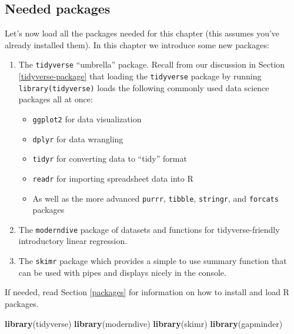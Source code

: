 \documentclass[12pt, krantz2,]{krantz}
\makeatletter
\newenvironment{Shaded}{\begin{snugshade}}{\end{snugshade}}
\newcommand{\KeywordTok}[1]{\textcolor[rgb]{0.27,0.27,0.27}{\textbf{#1}}}
\newcommand{\NormalTok}[1]{#1}
\providecommand{\tightlist}{%
  \setlength{\itemsep}{0pt}\setlength{\parskip}{0pt}}
\newenvironment{kframe}{%
\medskip{}
\setlength{\fboxsep}{.8em}
 \def\at@end@of@kframe{}%
 \ifinner\ifhmode%
  \def\at@end@of@kframe{\end{minipage}}%
  \begin{minipage}{\columnwidth}%
 \fi\fi%
 \def\FrameCommand##1{\hskip\@totalleftmargin \hskip-\fboxsep
 \colorbox{shadecolor}{##1}\hskip-\fboxsep
     \hskip-\linewidth \hskip-\@totalleftmargin \hskip\columnwidth}%
 \MakeFramed {\advance\hsize-\width
   \@totalleftmargin\z@ \linewidth\hsize
   \@setminipage}}%
 {\par\unskip\endMakeFramed%
 \at@end@of@kframe}
\renewenvironment{Shaded}{\begin{kframe}}{\end{kframe}}
\makeatother
\begin{document}
\hypertarget{needed-packages-3}{%
\subsection*{Needed packages}\label{needed-packages-3}}


Let's now load all the packages needed for this chapter (this assumes you've already installed them). In this chapter we introduce some new packages:

\begin{enumerate}
\def\labelenumi{\arabic{enumi}.}
\tightlist
\item
  The \texttt{tidyverse} ``umbrella'' package. Recall from our discussion in Section \ref{tidyverse-package} that loading the \texttt{tidyverse} package by running \texttt{library(tidyverse)} loads the following commonly used data science packages all at once:

  \begin{itemize}
  \tightlist
  \item
    \texttt{ggplot2} for data visualization
  \item
    \texttt{dplyr} for data wrangling
  \item
    \texttt{tidyr} for converting data to ``tidy'' format
  \item
    \texttt{readr} for importing spreadsheet data into R
  \item
    As well as the more advanced \texttt{purrr}, \texttt{tibble}, \texttt{stringr}, and \texttt{forcats} packages
  \end{itemize}
\item
  The \texttt{moderndive} package of datasets and functions for tidyverse-friendly introductory linear regression.
\item
  The \texttt{skimr} package which provides a simple to use summary function that can be used with pipes and displays nicely in the console.
\end{enumerate}

If needed, read Section \ref{packages} for information on how to install and load R packages.

\begin{Shaded}
\begin{Highlighting}[]
\KeywordTok{library}\NormalTok{(tidyverse)}
\KeywordTok{library}\NormalTok{(moderndive)}
\KeywordTok{library}\NormalTok{(skimr)}
\KeywordTok{library}\NormalTok{(gapminder)}
\end{Highlighting}
\end{Shaded}
\end{document}
